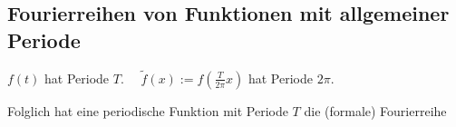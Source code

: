 	\subsection{Fourierreihen von Funktionen mit allgemeiner Periode} %
		$f(t)$ hat Periode $T$.
		$\quad \widetilde f(x) := f(\frac{T}{2\pi}x)$ hat Periode $2\pi$.
		
		Folglich hat eine periodische Funktion mit Periode $T$ die (formale) Fourierreihe 

